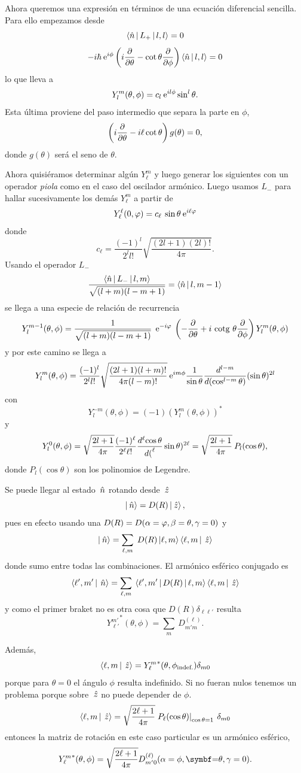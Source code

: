 \documentclass[10pt,oneside]{CBFT_book}
\begin{document}
Ahora queremos una expresión en términos de una ecuación diferencial sencilla. Para ello
empezamos desde 
\[
	\Braket{\hat{n}|L_+|l,l} = 0
\]
\[
	-i\hbar\euler^{i\phi}\left( i\dpar{}{\theta}-\cot\theta\dpar{}{\phi} \right)
	\Braket{\hat{n}|l,l} = 0 
\]
lo que lleva a 
\[
	Y_l^m(\theta,\phi)  = c_l \euler^{il\phi}\sin^l\theta.
\]
Esta última proviene del paso intermedio que separa la parte en $\phi$,
\[
	\left( i\dpar{}{\theta}- i \ell \cot\theta \right) g(\theta) = 0,
\]
donde $g(\theta)$ será el seno de $\theta$.

Ahora quisiéramos determinar algún $Y_\ell^m$ y luego generar los siguientes con un
operador {\it piola} como en el caso del oscilador armónico.
Luego usamos $L_-$ para hallar sucesivamente los demás $Y^m_\ell$ a partir de
\[
	Y_\ell^\ell(0,\vp) = c_\ell \: \sin\theta \euler^{i\ell\vp}
\]
donde 
\[
	c_\ell = \frac{(-1)^l}{2^ll!}\sqrt{\frac{(2l+1)(2l)!}{4\pi}}.
\]
Usando el operador $L_-$
\[
	\frac{\Braket{\hat{n}|L_-|l,m} }{\sqrt{(l+m)(l-m+1)}} = \Braket{\hat{n}|l,m-1} 
\]
se llega a una especie de relación de recurrencia
\[
	Y_l^{m-1}(\theta,\phi) =  \frac{1}{\sqrt{(l+m)(l-m+1)}} \: \euler^{-i\vp} \:
	\left( -\dpar{}{\theta} + i \cotg\theta \dpar{}{\phi} \right)
	Y_l^{m}(\theta,\phi)
\]
y por este camino se llega a 
\[
	Y_l^m(\theta,\phi) = \frac{(-1)^l}{2^ll!}\sqrt{\frac{(2l+1)(l+m)!}{4\pi(l-m)!}} 
	\euler^{im\phi} \frac{1}{\sin\theta}
	\dtot{^{l-m}}{(\cos^{l-m}\theta)}(\sin\theta)^{2l}
\]
con 
\[
	Y_l^{-m}(\theta,\phi) = (-1)( Y_l^m(\theta,\phi) )^* 
\]
y
\[
	Y_l^0(\theta,\phi) = \sqrt{\frac{2l+1}{4\pi}}
	\frac{(-1)^\ell}{2^\ell \ell!} \dtot[\ell]{\cos\theta}(\sin\theta)^{2\ell}
	= \sqrt{\frac{2l+1}{4\pi}} \: P_l(\cos\theta),
\]
donde $P_l(\cos\theta)$ son los polinomios de Legendre.

Se puede llegar al estado $\nver$ rotando desde $\zver$
\[
	\Ket{\nver} = D(R)\Ket{\zver},
\]
pues en efecto usando una $D(R)=D(\a=\vp,\b=\theta,\gamma=0)$ y
\[
	\Ket{\nver} = \sum_{\ell,m} \; D(R) \Ket{\ell,m}\Braket{\ell,m|\zver}
\]
donde sumo entre todas las combinaciones. El armónico esférico conjugado es
\[
	\Braket{\ell',m' | \nver } = \sum_{\ell,m} \: 
	\Braket{ \ell',m'|D(R)|\ell,m } \Braket{\ell,m|\zver}
\]
y como el primer braket no es otra cosa que $D(R)\delta_{\ell\ell'}$ resulta
\[
	{Y_{\ell'}^{m'}}^*(\theta,\phi) = \sum_{m} \: D_{m' m}^{(\ell)} .
\]

Además,
\[
	\Braket{\ell,m|\zver} = {Y_{\ell}^{m}}^*(\theta,\phi_{\text{indef.}}) \delta_{m0}
\]
porque para $\theta=0$ el ángulo $\phi$ resulta indefinido.
Si no fueran nulos tenemos un problema porque sobre $\zver$ no puede depender de $\phi$.
\[
	\Braket{\ell,m|\zver} = \sqrt{\frac{2\ell+1}{4\pi}} \left. 
	P_\ell(\cos\theta)\right|_{\cos\theta=1} \: \delta_{m0}
\]
entonces la matriz de rotación en este caso particular es un armónico esférico,
\[
	{Y_{\ell}^{m}}^*(\theta,\phi)  = \sqrt{\frac{2\ell+1}{4\pi}}
	D_{m' 0}^{(\ell)}(\a=\phi,\vb=\theta,\gamma=0).
\]
\end{document}
